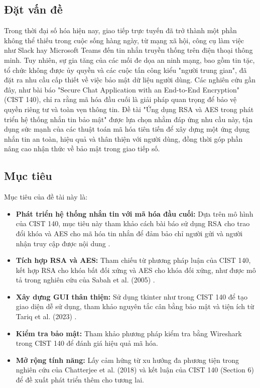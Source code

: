 \setcounter{section}{0}
\renewcommand{\thesubsection}{\arabic{subsection}.}

\subsection{ Đặt vấn đề}
\hspace*{2em} Trong thời đại số hóa hiện nay, giao tiếp trực tuyến đã trở thành một phần không thể thiếu trong cuộc sống hàng ngày, từ mạng xã hội, công cụ làm việc như Slack hay Microsoft Teams đến tin nhắn truyền thống trên điện thoại thông minh. Tuy nhiên, sự gia tăng của các mối đe dọa an ninh mạng, bao gồm tin tặc, tổ chức không được ủy quyền và các cuộc tấn công kiểu "người trung gian", đã đặt ra nhu cầu cấp thiết về việc bảo mật dữ liệu người dùng. Các nghiên cứu gần đây, như bài báo "Secure Chat Application with an End-to-End Encryption" (CIST 140), chỉ ra rằng mã hóa đầu cuối là giải pháp quan trọng để bảo vệ quyền riêng tư và toàn vẹn thông tin. Đề tài "Ứng dụng RSA và AES trong phát triển hệ thống nhắn tin bảo mật" được lựa chọn nhằm đáp ứng nhu cầu này, tận dụng sức mạnh của các thuật toán mã hóa tiên tiến để xây dựng một ứng dụng nhắn tin an toàn, hiệu quả và thân thiện với người dùng, đồng thời góp phần nâng cao nhận thức về bảo mật trong giao tiếp số.
\subsection{ Mục tiêu}
\hspace*{2em} Mục tiêu của đề tài này là:
\begin{itemize}
  \item \textbf{Phát triển hệ thống nhắn tin với mã hóa đầu cuối:} 
  Dựa trên mô hình của CIST 140, mục tiêu này tham khảo cách bài báo sử dụng RSA cho trao đổi khóa và AES cho mã hóa tin nhắn để đảm bảo chỉ người gửi và người nhận truy cập được nội dung \cite{carranza2024}.

  \item \textbf{Tích hợp RSA và AES:} 
  Tham chiếu từ phương pháp luận của CIST 140, kết hợp RSA cho khóa bất đối xứng và AES cho khóa đối xứng, như được mô tả trong nghiên cứu của Sabah et al. (2005) \cite{sabah2005}.

  \item \textbf{Xây dựng GUI thân thiện:} 
  Sử dụng tkinter như trong CIST 140 để tạo giao diện dễ sử dụng, tham khảo nguyên tắc cân bằng bảo mật và tiện ích từ Tariq et al. (2023) \cite{tariq2023}.

  \item \textbf{Kiểm tra bảo mật:} Tham khảo phương pháp kiểm tra bằng Wireshark trong CIST 140 để đánh giá hiệu quả mã hóa.

  \item \textbf{Mở rộng tính năng:} Lấy cảm hứng từ xu hướng đa phương tiện trong nghiên cứu của Chatterjee et al. (2018) {\cite{chatterjee2018}} và kết luận của CIST 140 (Section 6) để đề xuất phát triển thêm cho tương lai.
\end{itemize}

